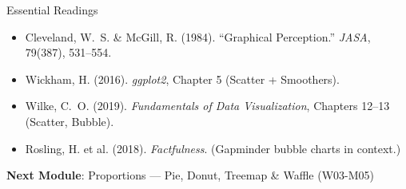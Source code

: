 \documentclass[10pt]{beamer}
\begin{document}
\begin{frame}{Essential Readings}
  \begin{itemize}
    \item Cleveland, W.~S. \& McGill, R. (1984). ``Graphical Perception.''
          \emph{JASA}, 79(387), 531--554.
    \item Wickham, H. (2016). \emph{ggplot2}, Chapter 5 (Scatter + Smoothers).
    \item Wilke, C.~O. (2019). \emph{Fundamentals of Data Visualization},
          Chapters 12--13 (Scatter, Bubble).
    \item Rosling, H. et al. (2018). \emph{Factfulness}. (Gapminder
          bubble charts in context.)
  \end{itemize}
  \vspace{6pt}
  \textbf{Next Module}: Proportions --- Pie, Donut, Treemap \& Waffle (W03-M05)
\end{frame}
\end{document}
